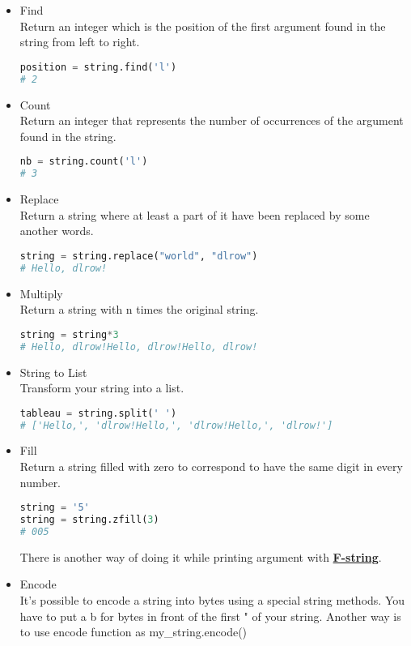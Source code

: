 \documentclass[a4paper, 12pt, titlepage]{scrartcl} %
\begin{document}
\begin{itemize}
\item Find \\
Return an integer which is the position of the first argument found in the string from left to right.
\begin{lstlisting}[language=Python]
position = string.find('l')
# 2
\end{lstlisting} \vspace{5mm}

\item Count \\
Return an integer that represents the number of occurrences of the argument found in the string. 
\begin{lstlisting}[language=Python]
nb = string.count('l')
# 3
\end{lstlisting} \vspace{5mm}

\item Replace \\
Return a string where at least a part of it have been replaced by some another words.
\begin{lstlisting}[language=Python]
string = string.replace("world", "dlrow")
# Hello, dlrow!
\end{lstlisting} \vspace{5mm}

\item Multiply \\
Return a string with n times the original string.
\begin{lstlisting}[language=Python]
string = string*3
# Hello, dlrow!Hello, dlrow!Hello, dlrow!
\end{lstlisting} \vspace{5mm}

\item String to List \\
Transform your string into a list.
\begin{lstlisting}[language=Python]
tableau = string.split(' ')
# ['Hello,', 'dlrow!Hello,', 'dlrow!Hello,', 'dlrow!']
\end{lstlisting} \vspace{5mm}

\item Fill \\
Return a string filled with zero to correspond to have the same digit in every number.
\begin{lstlisting}[language=Python]
string = '5'
string = string.zfill(3)
# 005
\end{lstlisting} \vspace{5mm}

There is another way of doing it while printing argument with \hyperref[subsec:F-string]{\textbf{F-string}}.

\item Encode \\
It's possible to encode a string into bytes using a special string methods. You have to put a b for bytes in front of the first " of your string. Another way is to use encode function as my\_string.encode()
\end{itemize}
\end{document}
